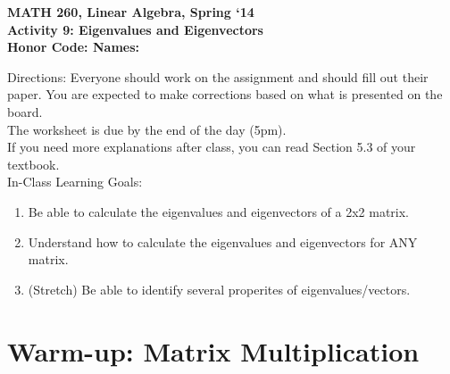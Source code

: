 \documentclass{article}
\begin{document}
\begin{flushleft}
	\bfseries{MATH 260, Linear Algebra, Spring `14}\\
	\bfseries{Activity 9:  Eigenvalues and Eigenvectors}\\
	\bfseries{Honor Code:} \hspace{3.5in}\bfseries{Names:}\\
\end{flushleft}
\begin{flushleft}
\vspace{.75in}
Directions:  Everyone should work on the assignment and should fill out their paper.  You are expected to make corrections based on what is presented on the board.  \\
\large The worksheet is due by the end of the day (5pm). \normalsize \\ 
If you need more explanations after class, you can read Section 5.3 of your textbook.\\
\vspace{0.1in}
\Large
In-Class Learning Goals:\\
\normalsize
\begin{enumerate}
\item Be able to calculate the eigenvalues and eigenvectors of a 2x2 matrix.
\item Understand how to calculate the eigenvalues and eigenvectors for ANY matrix.
\item (Stretch) Be able to identify several properites of eigenvalues/vectors.

\end{enumerate}

\vspace{0.1in}

\section*{Warm-up:  Matrix Multiplication}


\end{flushleft}
\end{document}
